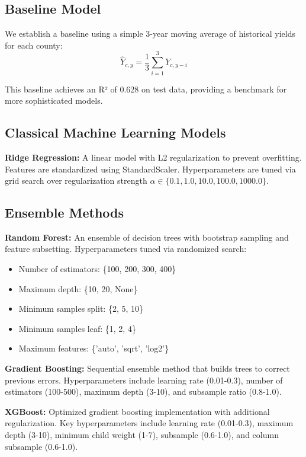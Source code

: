 \documentclass[conference]{IEEEtran}
\begin{document}
\subsection{Baseline Model}

We establish a baseline using a simple 3-year moving average of historical yields for each county:
\begin{equation}
\hat{Y}_{c,y} = \frac{1}{3}\sum_{i=1}^{3} Y_{c,y-i}
\end{equation}

This baseline achieves an R² of 0.628 on test data, providing a benchmark for more sophisticated models.

\subsection{Classical Machine Learning Models}

\textbf{Ridge Regression:} A linear model with L2 regularization to prevent overfitting. Features are standardized using StandardScaler. Hyperparameters are tuned via grid search over regularization strength $\alpha \in \{0.1, 1.0, 10.0, 100.0, 1000.0\}$.

\subsection{Ensemble Methods}

\textbf{Random Forest:} An ensemble of decision trees with bootstrap sampling and feature subsetting. Hyperparameters tuned via randomized search:
\begin{itemize}
    \item Number of estimators: \{100, 200, 300, 400\}
    \item Maximum depth: \{10, 20, None\}
    \item Minimum samples split: \{2, 5, 10\}
    \item Minimum samples leaf: \{1, 2, 4\}
    \item Maximum features: \{'auto', 'sqrt', 'log2'\}
\end{itemize}

\textbf{Gradient Boosting:} Sequential ensemble method that builds trees to correct previous errors. Hyperparameters include learning rate (0.01-0.3), number of estimators (100-500), maximum depth (3-10), and subsample ratio (0.8-1.0).

\textbf{XGBoost:} Optimized gradient boosting implementation with additional regularization. Key hyperparameters include learning rate (0.01-0.3), maximum depth (3-10), minimum child weight (1-7), subsample (0.6-1.0), and column subsample (0.6-1.0).
\end{document}
